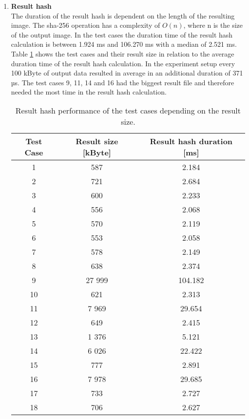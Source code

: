 \documentclass[draft,final]{vutinfth} %
\begin{document}
\begin{enumerate}
\begin{figure}[!h]
\begin{tikzpicture}
		\end{tikzpicture}
	\end{figure}
	\item \textbf{Result hash} \\
	The duration of the result hash is dependent on the length of the resulting image. The sha-256 operation has a complexity of $O(n)$, where n is the size of the output image. In the test cases the duration time of the result hash calculation is between 1.924 ms and 106.270 ms with a median of 2.521 ms. Table \ref{Tab:result_hash} shows the test cases and their result size in relation to the average duration time of the result hash calculation. In the experiment setup every 100 kByte of output data resulted in average in an additional duration of 371 µs. The test cases 9, 11, 14 and 16 had the biggest result file and therefore needed the most time in the result hash calculation.     
	
	\begin{table}[]
		\caption{Result hash performance of the test cases depending on the result size.}
		\begin{tabular}{c|c|c}
			\textbf{Test Case} & \textbf{Result size [kByte]} & \textbf{Result hash duration [ms]}  \\ \hline
			1 & 587  & 2.184 \\ \hline 
			2 & 721 & 2.684 \\ \hline
			3 & 600 & 2.233 \\ \hline
			4 & 556 & 2.068 \\ \hline
			5 & 570 & 2.119 \\ \hline
			6 & 553 & 2.058 \\ \hline
			7 & 578 & 2.149 \\ \hline
			8 & 638 & 2.374 \\ \hline
			9 & 27 999 & 104.182 \\ \hline
			10 & 621 & 2.313 \\ \hline
			11 & 7 969 & 29.654 \\ \hline
			12 & 649 & 2.415 \\ \hline
			13 & 1 376 & 5.121 \\ \hline
			14 & 6 026 & 22.422 \\ \hline
			15 & 777 & 2.891 \\ \hline
			16 & 7 978 & 29.685 \\ \hline
			17 & 733 & 2.727 \\ \hline
			18 & 706 & 2.627 \\ 
		\end{tabular}
		\label{Tab:result_hash}
	\end{table}
	

\end{enumerate}
\end{document}
